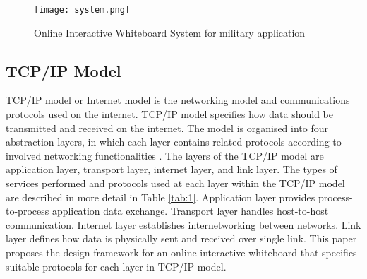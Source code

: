 \documentclass[conference]{IEEEtran}
\begin{document}
\begin{figure}[t]
\begin{center}
\texttt{[image: system.png]}
\caption{Online Interactive Whiteboard System for military application}
\label{fig:1}
\end{center}
\end{figure}

\subsection{TCP/IP Model}
TCP/IP model or Internet model is the networking model and communications protocols used on the internet. TCP/IP model specifies how data should be transmitted and received on the internet. The model is organised into four abstraction layers, in which each layer contains related protocols according to involved networking functionalities \cite{RFC1122}\cite{RFC1123}.  The layers of the TCP/IP model are application layer, transport layer, internet layer, and link layer. The types of services performed and protocols used at each layer within the TCP/IP model are described in more detail in Table \ref{tab:1}. Application layer provides process-to-process application data exchange. Transport layer handles host-to-host communication. Internet layer establishes internetworking between networks. Link layer defines how data is physically sent and received over single link. This paper proposes the design framework for an online interactive whiteboard that specifies suitable protocols for each layer in TCP/IP model.
\end{document}
